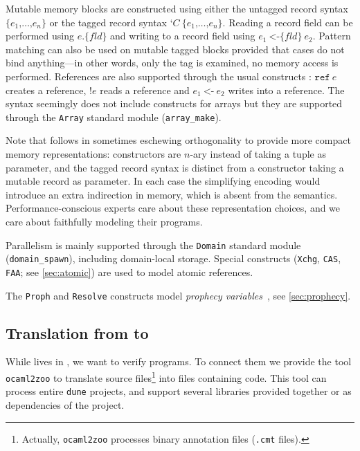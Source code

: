 Mutable memory blocks are constructed using either the untagged record syntax $\texttt{\{} e_1 \texttt{,} \dots \texttt{,} e_n \texttt{\}}$ or the tagged record syntax $\texttt{‘} C\ \texttt{\{} e_1 \texttt{,} \dots \texttt{,} e_n \texttt{\}}$.
Reading a record field can be performed using $e \texttt{.\{} \mathit{fld} \texttt{\}}$ and writing to a record field using $e_1\ \texttt{<-\{} \mathit{fld} \texttt{\}}\ e_2$.
Pattern matching can also be used on mutable tagged blocks provided that cases do not bind anything---in other words, only the tag is examined, no memory access is performed.
References are also supported through the usual constructs : $\texttt{ref}\ e$ creates a reference, $\texttt{!} e$ reads a reference and $e_1\ \texttt{<-}\ e_2$ writes into a reference.
The syntax seemingly does not include constructs for arrays but they are supported through the \texttt{Array} standard module (\eg \texttt{array\_make}).

Note that \ZooLang follows \OCaml in sometimes eschewing orthogonality to provide more compact memory representations: constructors are $n$-ary instead of taking a tuple as parameter, and the tagged record syntax is distinct from a constructor taking a mutable record as parameter. In each case the simplifying encoding would introduce an extra indirection in memory, which is absent from the \ZooLang semantics. Performance-conscious experts care about these representation choices, and we care about faithfully modeling their programs.

Parallelism is mainly supported through the \texttt{Domain} standard module (\eg \texttt{domain\_spawn}), including domain-local storage.
Special constructs (\texttt{Xchg}, \texttt{CAS}, \texttt{FAA}; see \cref{sec:atomic}) are used to model atomic references.

The \texttt{Proph} and \texttt{Resolve} constructs model \emph{prophecy variables}~\cite{DBLP:journals/pacmpl/JungLPRTDJ20}, see \cref{sec:prophecy}.

\subsection{Translation from \OCaml to \ZooLang}



While \ZooLang lives in \Rocq, we want to verify \OCaml programs.
To connect them we provide the tool \texttt{ocaml2zoo} to translate \OCaml source files\footnote{Actually, \texttt{ocaml2zoo} processes binary annotation files (\texttt{.cmt} files).} into \Rocq files containing \ZooLang code.
This tool can process entire \texttt{dune} projects, and support several libraries provided together or as dependencies of the project.

